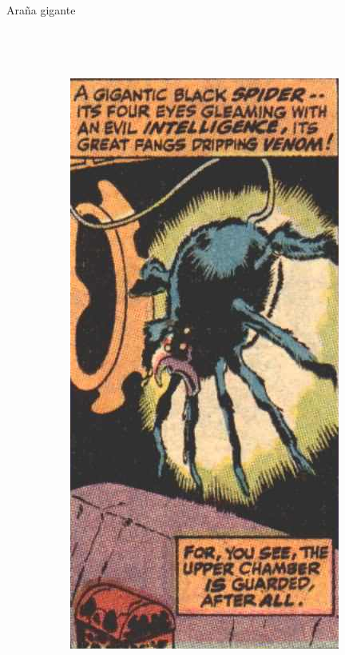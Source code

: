 \begin{frame}{Araña gigante}
\begin{columns}
\begin{figure}[htp]
\begin{subfigure}[b]{0.3\textwidth}
 \end{subfigure}
~
 \begin{subfigure}[b]{0.2\textwidth}
   \includegraphics[width=\textwidth]{img/arana/CTB}
 \end{subfigure}
\end{figure}
\end{columns}
\end{frame}

